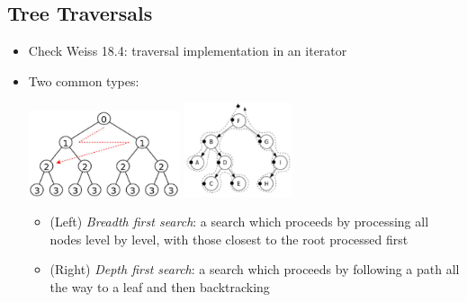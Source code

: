 \documentclass[10pt]{article}
\begin{document}
\subsection*{Tree Traversals}
\begin{itemize}
    \item Check Weiss 18.4: traversal implementation in an iterator
    \item Two common types:
    \begin{center}
        \includegraphics[width=0.35\textwidth]{images/1.png}
        \includegraphics[width=0.25\textwidth]{images/2.png}
    \end{center}
    \begin{itemize}
        \item (Left) \textit{Breadth first search}: a search which proceeds by processing all nodes level by level, with those closest to the root processed first
        \item (Right) \textit{Depth first search}: a search which proceeds by following a path all the way to a leaf and then backtracking
    \end{itemize}
\end{itemize}
\end{document}
